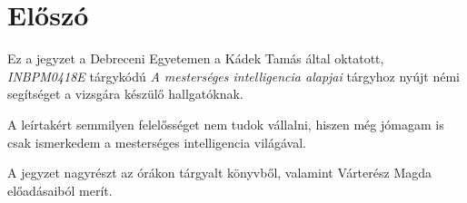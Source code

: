 \section*{Előszó}
Ez a jegyzet a Debreceni Egyetemen a Kádek Tamás által oktatott,
\textit{INBPM0418E} tárgykódú \textit{A mesterséges intelligencia alapjai}
tárgyhoz nyújt némi segítséget a vizsgára készülő hallgatóknak.

A leírtakért semmilyen felelősséget nem tudok vállalni, hiszen még jómagam is
csak ismerkedem a mesterséges intelligencia világával.

A jegyzet nagyrészt az órákon tárgyalt könyvből\cite{nagykonyv}, valamint
Várterész Magda előadásaiból\cite{varteresz} merít.
